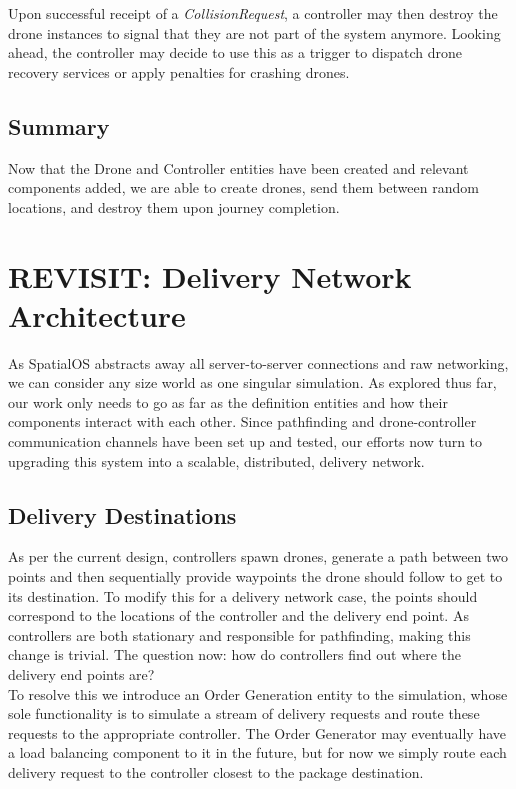 \documentclass[a4paper,12pt,titlepage]{article}
\begin{document}
Upon successful receipt of a \textit{CollisionRequest}, a controller may then destroy the drone instances to signal that they are not part of the system anymore. Looking ahead, the controller may decide to use this as a trigger to dispatch drone recovery services or apply penalties for crashing drones.

\subsection{Summary}
Now that the Drone and Controller entities have been created and relevant components added, we are able to create drones, send them between random locations, and destroy them upon journey completion.


\newpage
\section{REVISIT: Delivery Network Architecture}
As SpatialOS abstracts away all server-to-server connections and raw networking, we can consider any size world as one singular simulation. As explored thus far, our work only needs to go as far as the definition entities and how their components interact with each other. Since pathfinding and drone-controller communication channels have been set up and tested, our efforts now turn to upgrading this system into a scalable, distributed, delivery network.

\subsection{Delivery Destinations}
As per the current design, controllers spawn drones, generate a path between two points and then sequentially provide waypoints the drone should follow to get to its destination. To modify this for a delivery network case, the points should correspond to the locations of the controller and the delivery end point. As controllers are both stationary and responsible for pathfinding, making this change is trivial. The question now: how do controllers find out where the delivery end points are?\\

To resolve this we introduce an Order Generation entity to the simulation, whose sole functionality is to simulate a stream of delivery requests and route these requests to the appropriate controller. The Order Generator may eventually have a load balancing component to it in the future, but for now we simply route each delivery request to the controller closest to the package destination.\\
\end{document}
